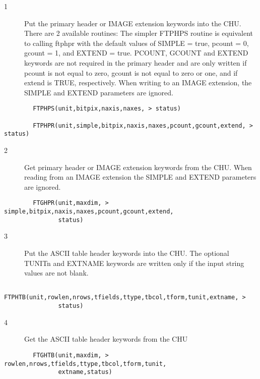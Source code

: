 \documentclass[11pt]{book}
\begin{document}
\begin{description}
\item[1 ] Put the primary header or IMAGE extension keywords into the CHU.
There are 2 available routines: The simpler FTPHPS routine is
equivalent to calling ftphpr with the default values of SIMPLE = true,
pcount = 0, gcount = 1, and EXTEND = true.  PCOUNT, GCOUNT and EXTEND
keywords are not required in the primary header and are only written if
pcount is not equal to zero, gcount is not equal to zero or one, and if
extend is TRUE, respectively.  When writing to an IMAGE extension, the
SIMPLE and EXTEND parameters are ignored.
\end{description}

\begin{verbatim}
        FTPHPS(unit,bitpix,naxis,naxes, > status)

        FTPHPR(unit,simple,bitpix,naxis,naxes,pcount,gcount,extend, > status)
\end{verbatim}

\begin{description}
\item[2 ] Get primary header or IMAGE extension keywords from the CHU.  When
    reading from an IMAGE extension the SIMPLE and EXTEND parameters are
   ignored.
\end{description}

\begin{verbatim}
        FTGHPR(unit,maxdim, > simple,bitpix,naxis,naxes,pcount,gcount,extend,
               status)
\end{verbatim}

\begin{description}
\item[3 ] Put the ASCII table header keywords into the CHU. The optional
TUNITn and EXTNAME keywords are written only if the input string
values are not blank.
\end{description}

\begin{verbatim}
        FTPHTB(unit,rowlen,nrows,tfields,ttype,tbcol,tform,tunit,extname, >
               status)
\end{verbatim}

\begin{description}
\item[4 ] Get the ASCII table header keywords from the CHU
\end{description}

\begin{verbatim}
        FTGHTB(unit,maxdim, > rowlen,nrows,tfields,ttype,tbcol,tform,tunit,
               extname,status)
\end{verbatim}
\end{document}
